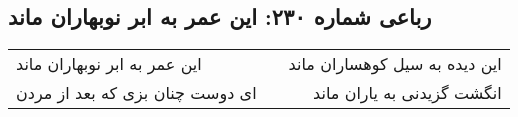 \begin{center}
\section*{رباعی شماره ۲۳۰: این عمر به ابر نوبهاران ماند}
\label{sec:sh230}
\begin{longtable}{l p{0.5cm} r}
این عمر به ابر نوبهاران ماند
&&
این دیده به سیل کوهساران ماند
\\
ای دوست چنان بزی که بعد از مردن
&&
انگشت گزیدنی به یاران ماند
\\
\end{longtable}
\end{center}
